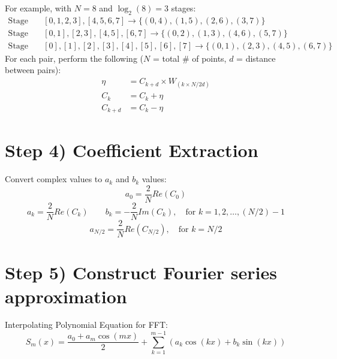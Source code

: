 \documentclass[12pt]{article}
\begin{document}
$ $\\
For example, with $N=8$ and $\log_2(8)=3$ stages:
\begin{align*}
\text{Stage 1:} & \quad [0,1,2,3],[4,5,6,7] \to \{(0,4),(1,5),(2,6),(3,7)\}\\
\text{Stage 2:} & \quad [0,1],[2,3],[4,5],[6,7] \to \{(0,2),(1,3),(4,6),(5,7)\}\\
\text{Stage 3:} & \quad [0],[1],[2],[3],[4],[5],[6],[7] \to \{(0,1),(2,3),(4,5),(6,7)\}
\end{align*}
$ $\\
For each pair, perform the following ($N$ = total \# of points, $d$ = distance between pairs):
\begin{align*}
\eta &= C_{k+d} \times W_{(k\times N/2d)}\\
C_k &= C_k + \eta\\
C_{k+d} &= C_k - \eta
\end{align*}

\section*{Step 4) Coefficient Extraction}
Convert complex values to $a_k$ and $b_k$ values:
\[a_0 = \frac{2}{N}Re(C_0)\]
\[a_k = \frac{2}{N}Re(C_k) \quad \quad b_k = -\frac{2}{N}Im(C_k), \quad \text{for } k=1,2,\ldots,(N/2)-1\]
\[a_{N/2} = \frac{2}{N}Re(C_{N/2}), \quad \text{for } k = N/2\]

\section*{Step 5) Construct Fourier series approximation}
Interpolating Polynomial Equation for FFT:
\[S_m(x) = \frac{a_0 + a_m\cos(mx)}{2} + \sum_{k=1}^{m-1}(a_k\cos(kx) + b_k\sin(kx))\]
\end{document}
